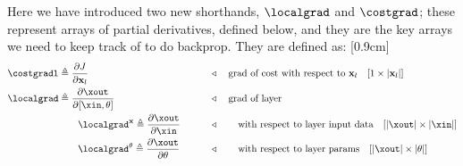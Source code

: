 
Here we have introduced two new shorthands, $\localgrad$ and $\costgrad$; these represent arrays of partial derivatives, defined below, and they are the key arrays we need to keep track of to do backprop. They are defined as:
[0.9cm]
\begin{align}
    \costgradl &\triangleq \frac{\partial J}{\partial \mathbf{x}_l} &&\quad\quad \triangleleft \quad \text{grad of cost with respect to } \mathbf{x}_l \quad [1 \times |\mathbf{x}_l|]\\
    \localgrad &\triangleq \frac{\partial \xout}{\partial [\xin, \theta]} &&\quad\quad \triangleleft \quad \text{grad of layer}\\
    &\quad\quad \localgrad^{\mathbf{x}} \triangleq \frac{\partial \xout}{\partial \xin} &&\quad\quad \triangleleft \quad \text{\quad with respect to layer input data} \quad [|\xout| \times |\xin|]\\
    &\quad\quad \localgrad^{\theta} \triangleq \frac{\partial \xout}{\partial \theta} &&\quad\quad \triangleleft \quad \text{\quad with respect to layer params} \quad [|\xout| \times |\theta|]
\end{align}

